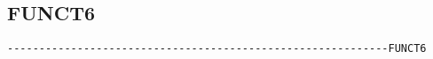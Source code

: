 

\subsection{FUNCT6}
\begin{verbatim}
------------------------------------------------------------FUNCT6
\end{verbatim}

